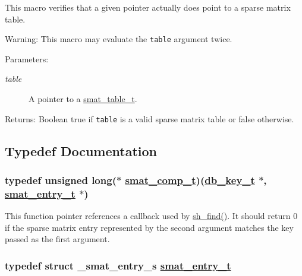 This macro verifies that a given pointer actually does point to a sparse matrix table.

\begin{Desc}
\item[Warning:]This macro may evaluate the {\tt table} argument twice.\end{Desc}
\begin{Desc}
\item[Parameters:]
\begin{description}
\item[{\em table}]A pointer to a \hyperlink{group__dbprim__smat_a0}{smat\_\-table\_\-t}.\end{description}
\end{Desc}
\begin{Desc}
\item[Returns:]Boolean true if {\tt table} is a valid sparse matrix table or false otherwise. \end{Desc}


\subsection{Typedef Documentation}
\hypertarget{group__dbprim__smat_a5}{
\subsubsection[smat\_\-comp\_\-t]{\setlength{\rightskip}{0pt plus 5cm}typedef unsigned long($\ast$ \hyperlink{dbprim_8h_a5}{smat\_\-comp\_\-t})(\hyperlink{dbprim_8h_a0}{db\_\-key\_\-t} $\ast$, \hyperlink{dbprim_8h_a2}{smat\_\-entry\_\-t} $\ast$)}}
\label{group__dbprim__smat_a5}


This function pointer references a callback used by \hyperlink{group__dbprim__smat_a19}{sh\_\-find()}. It should return 0 if the sparse matrix entry represented by the second argument matches the key passed as the first argument. \hypertarget{group__dbprim__smat_a2}{
\subsubsection[smat\_\-entry\_\-t]{\setlength{\rightskip}{0pt plus 5cm}typedef struct \_\-smat\_\-entry\_\-s \hyperlink{dbprim_8h_a2}{smat\_\-entry\_\-t}}}
\label{group__dbprim__smat_a2}


